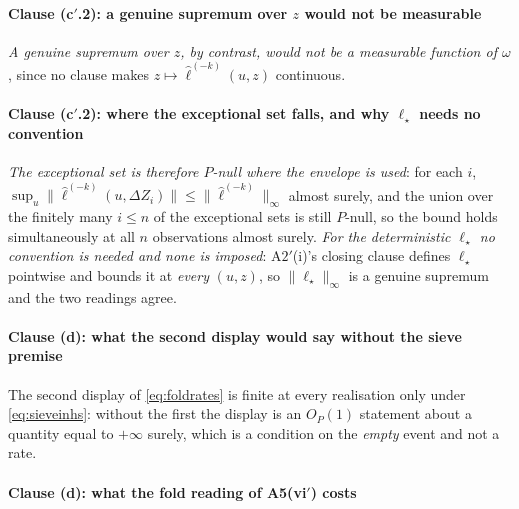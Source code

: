 \paragraph{Clause \textup{(c$'$.2)}: a genuine supremum over $z$ would not be measurable}

\emph{A genuine supremum over $z$, by contrast, would not be a measurable function of $\omega$}, since no
clause makes $z\mapsto\hat\ell^{(-k)}(u,z)$ continuous.

\paragraph{Clause \textup{(c$'$.2)}: where the exceptional set falls, and why $\ell_\star$ needs no convention}

\emph{The exceptional set is therefore $P$-null where the envelope is used}:
for each $i$, $\sup_u\|\hat\ell^{(-k)}(u,\Delta Z_i)\|\le\|\hat\ell^{(-k)}\|_\infty$ almost surely, and
the union over the finitely many $i\le n$ of the exceptional sets is still $P$-null, so the bound holds
simultaneously at all $n$ observations almost surely. \emph{For the deterministic $\ell_\star$ no
convention is needed and none is imposed}: A$2'$(i)'s closing clause defines $\ell_\star$ pointwise and
 bounds it at \emph{every} $(u,z)$, so $\|\ell_\star\|_\infty$ is a genuine supremum and
the two readings agree.

\paragraph{Clause \textup{(d)}: what the second display would say without the sieve premise}

The second display of \eqref{eq:foldrates} is finite at every realisation only under
\eqref{eq:sieveinhs}: without the first the display is an $O_P(1)$ statement about a quantity equal to
$+\infty$ surely, which is a condition on the \emph{empty} event and not a rate.

\paragraph{Clause \textup{(d)}: what the fold reading of A5(vi$'$) costs}

